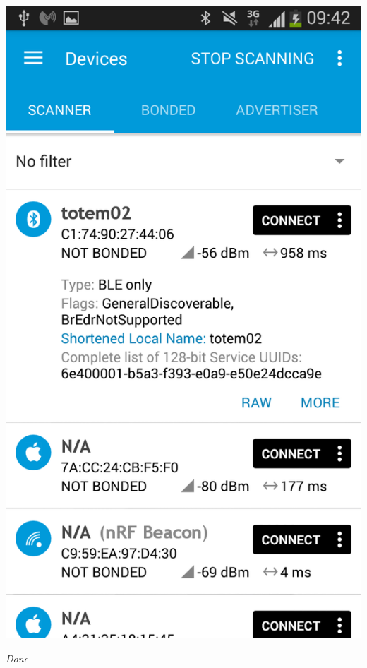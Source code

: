 \documentclass[conference]{IEEEtran}
\begin{document}
\begin{center}
    \includegraphics[scale=0.3]{FOTA10}
    \begin{minipage}{0.6\textwidth}
    \footnotesize
    \emph{Done}
    \end{minipage}
\end{center}
\end{document}

